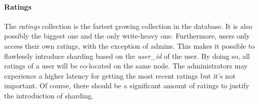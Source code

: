 \documentclass[11pt]{article}
\begin{document}
\paragraph{Ratings}
The \emph{ratings} collection is the fastest growing collection in the database. It is also possibly the biggest one and the only write-heavy one. Furthermore, users only access their own ratings, with the exception of admins. This makes it possible to flawlessly introduce sharding based on the \emph{user\_id} of the user. By doing so, all ratings of a user will be co-located on the same node. The administrators may experience a higher latency for getting the most recent ratings but it's not important.
Of course, there should be a significant amount of ratings to justify the introduction of sharding.
\end{document}
